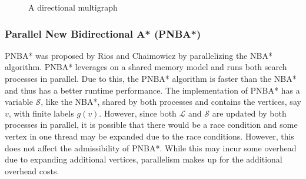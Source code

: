     \begin{figure}
        \caption{A directional multigraph}
        \label{uni-multigraph1}
        \begin{center}
        \end{center}
        
    \end{figure}

\subsubsection{Parallel New Bidirectional A* (PNBA*)}
PNBA* was proposed by Rios and Chaimowicz by parallelizing the NBA* algorithm.\cite{Rios2011}
PNBA* leverages on a shared memory model and runs both search processes in parallel. Due to this, the PNBA* algorithm is 
faster than the NBA* and thus has a better runtime performance. The implementation of PNBA* has a variable $\mathcal{S}$, like the 
NBA*, shared by both processes and contains the vertices, say $v$, with finite labels $g(v)$. However, since both $\mathcal{L}$
and $\mathcal{S}$ are updated by both processes in parallel, it is possible that there would be a race condition and some vertex 
in one thread may be expanded due to the race conditions. However, this does not affect the admissibility of PNBA*.
While this may incur some overhead due to expanding additional vertices, parallelism makes up for the additional overhead costs.\cite{Rios2011}

